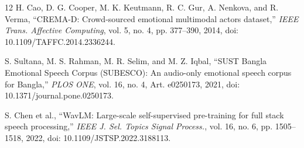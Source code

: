 \documentclass[letterpaper]{article}
\begin{document}
\begin{thebibliography}{12}
 H. Cao, D. G. Cooper, M. K. Keutmann, R. C. Gur, A. Nenkova, and R. Verma, ``CREMA-D: Crowd-sourced emotional multimodal actors dataset,'' \emph{IEEE Trans. Affective Computing}, vol. 5, no. 4, pp. 377--390, 2014, doi: 10.1109/TAFFC.2014.2336244.

 S. Sultana, M. S. Rahman, M. R. Selim, and M. Z. Iqbal, ``SUST Bangla Emotional Speech Corpus (SUBESCO): An audio-only emotional speech corpus for Bangla,'' \emph{PLOS ONE}, vol. 16, no. 4, Art. e0250173, 2021, doi: 10.1371/journal.pone.0250173.

 S. Chen et al., ``WavLM: Large-scale self-supervised pre-training for full stack speech processing,'' \emph{IEEE J. Sel. Topics Signal Process.}, vol. 16, no. 6, pp. 1505--1518, 2022, doi: 10.1109/JSTSP.2022.3188113.

\end{thebibliography}
\end{document}
